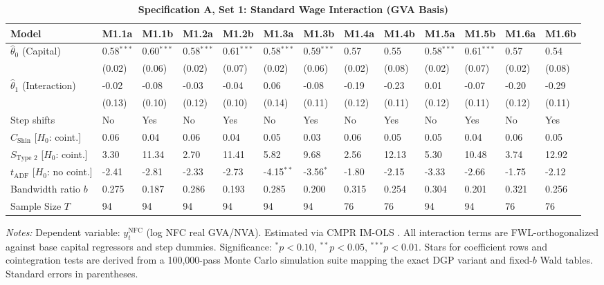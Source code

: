 \FloatBarrier
\begin{table}[h!]
	\centering
	\caption{\textbf{Specification A, Set 1: Standard Wage Interaction (GVA Basis)}}
	\label{tab:specA_set1_gva_app}
	\tiny
	\setlength{\tabcolsep}{1.5pt}
	\begin{tabular}{p{3.2cm}p{1.0cm}p{1.0cm}p{1.0cm}p{1.0cm}p{1.0cm}p{1.0cm}p{1.0cm}p{1.0cm}p{1.0cm}p{1.0cm}p{1.0cm}p{1.0cm}}
		\toprule
		Model & M1.1a & M1.1b & M1.2a & M1.2b & M1.3a & M1.3b & M1.4a & M1.4b & M1.5a & M1.5b & M1.6a & M1.6b \\
		\midrule
		$\hat{\theta}_0$ (Capital) & 0.58$^{***}$ & 0.60$^{***}$ & 0.58$^{***}$ & 0.61$^{***}$ & 0.58$^{***}$ & 0.59$^{***}$ & 0.57 & 0.55 & 0.58$^{***}$ & 0.61$^{***}$ & 0.57 & 0.54 \\
		& (0.02) & (0.06) & (0.02) & (0.07) & (0.02) & (0.06) & (0.02) & (0.08) & (0.02) & (0.07) & (0.02) & (0.08) \\
		$\hat{\theta}_1$ (Interaction) & -0.02 & -0.08 & -0.03 & -0.04 & 0.06 & -0.08 & -0.19 & -0.23 & 0.01 & -0.07 & -0.20 & -0.29 \\
		& (0.13) & (0.10) & (0.12) & (0.10) & (0.14) & (0.11) & (0.12) & (0.11) & (0.12) & (0.11) & (0.12) & (0.11) \\
		\midrule
		Step shifts & No & Yes & No & Yes & No & Yes & No & Yes & No & Yes & No & Yes \\
		$C_{\text{Shin}}$ [$H_0$: coint.] & 0.06 & 0.04 & 0.06 & 0.04 & 0.05 & 0.03 & 0.06 & 0.05 & 0.05 & 0.04 & 0.06 & 0.05 \\
		$S_{\text{Type 2}}$ [$H_0$: coint.] & 3.30 & 11.34 & 2.70 & 11.41 & 5.82 & 9.68 & 2.56 & 12.13 & 5.30 & 10.48 & 3.74 & 12.92 \\
		$t_{\text{ADF}}$ [$H_0$: no coint.] & -2.41 & -2.81 & -2.33 & -2.73 & -4.15$^{**}$ & -3.56$^{*}$ & -1.80 & -2.15 & -3.33 & -2.66 & -1.75 & -2.12 \\
		Bandwidth ratio $b$ & 0.275 & 0.187 & 0.286 & 0.193 & 0.285 & 0.200 & 0.315 & 0.254 & 0.304 & 0.201 & 0.321 & 0.256 \\
		Sample Size $T$ & 94 & 94 & 94 & 94 & 94 & 94 & 76 & 76 & 94 & 94 & 76 & 76 \\
		\bottomrule
	\end{tabular}
	\begin{minipage}{\textwidth}
		\scriptsize
		\textit{Notes:} Dependent variable: $y_t^{\text{NFC}}$ (log NFC real GVA/NVA). Estimated via CMPR IM-OLS \citep{VogelsangWagner2014}. All interaction terms are FWL-orthogonalized against base capital regressors and step dummies. Significance: $^*p<0.10$, $^{**}p<0.05$, $^{***}p<0.01$. Stars for coefficient rows and cointegration tests are derived from a 100,000-pass Monte Carlo simulation suite mapping the exact DGP variant and fixed-$b$ Wald tables. Standard errors in parentheses.
	\end{minipage}
\end{table}

